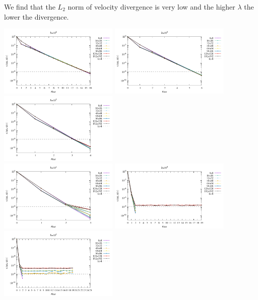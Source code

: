 We find that the $L_2$ norm of velocity divergence is very low and the higher $\lambda$ the lower 
the divergence.

\begin{center}
\includegraphics[width=5.7cm]{python_codes/fieldstone_161/results/bench1/conv1.pdf}
\includegraphics[width=5.7cm]{python_codes/fieldstone_161/results/bench1/conv2.pdf}
\includegraphics[width=5.7cm]{python_codes/fieldstone_161/results/bench1/conv3.pdf}\\
\includegraphics[width=5.7cm]{python_codes/fieldstone_161/results/bench1/conv4.pdf}
\includegraphics[width=5.7cm]{python_codes/fieldstone_161/results/bench1/conv5.pdf}
\includegraphics[width=5.7cm]{python_codes/fieldstone_161/results/bench1/conv6.pdf}
\end{center}

